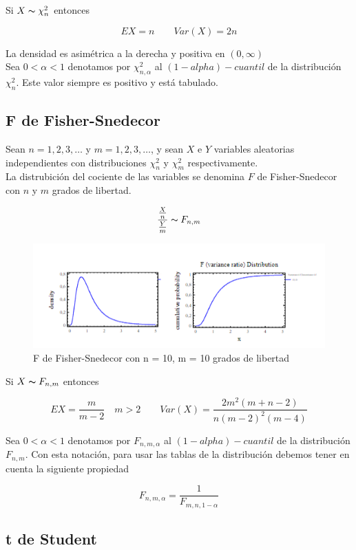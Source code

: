 Si $X \thicksim \chi^2_n$ entonces

\[
    EX = n \qquad Var(X) = 2n
\]

La densidad es asimétrica a la derecha y positiva en $(0, \infty)$ \\
Sea $0 < \alpha < 1$ denotamos por $\chi^2_{n,\alpha}$ al $(1-alpha)-cuantil$ de la distribución $\chi^2_n$. Este valor siempre es positivo y está tabulado.

\subsection{F de Fisher-Snedecor}

Sean $n = 1,2,3,\dots$ y $m = 1,2,3,\dots$, y sean $X$ e $Y$ variables aleatorias independientes con distribuciones $\chi^2_n$ y $\chi^2_m$ respectivamente. \\
La distrubición del cociente de las variables se denomina $F$ de Fisher-Snedecor con $n$ y $m$ grados de libertad.

\[
    \frac{\frac{X}{n}}{\frac{Y}{m}} \thicksim F_{n,m}
\]

\begin{figure}[h!]
    \begin{center}
        \includegraphics{img/F10.png}
    \end{center}
    \caption{F de Fisher-Snedecor con n = 10, m = 10 grados de libertad}
\end{figure}

Si $X \thicksim F_{n, m}$ entonces

\[
    EX = \frac{m}{m-2} \quad m > 2 \qquad Var(X) = \frac{2m^2(m+n-2)}{n(m-2)^2(m-4)}
\]

Sea $0 < \alpha < 1$ denotamos por $F_{n,m,\alpha}$ al $(1-alpha)-cuantil$ de la distribución $F_{n,m}$. Con esta notación, para usar las tablas de la distribución
debemos tener en cuenta la siguiente propiedad

\[
    F_{n,m,\alpha} = \frac{1}{F_{m,n,1-\alpha}}
\]

\subsection{t de Student}

